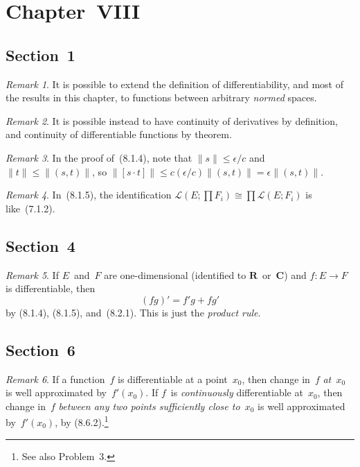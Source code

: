 \documentclass[letterpaper,12pt]{article}
\newcommand{\R}{\mathbf{R}}
\newcommand{\C}{\mathbf{C}}
\renewcommand{\L}{\mathcal{L}}
\newcommand{\iso}{\cong}
\newcommand{\norm}[1]{\lVert{#1}\rVert}
\newcommand{\cbprod}[2]{[{#1}\cdot{#2}]}
\theoremstyle{plain}
\theoremstyle{definition}
\theoremstyle{remark}
\newtheorem*{rmk}{Remark}
\begin{document}
\section*{Chapter~VIII}
\subsection*{Section~1}
\begin{rmk}
It is possible to extend the definition of differentiability, and most of the results in this chapter, to functions between arbitrary \emph{normed} spaces.
\end{rmk}

\begin{rmk}
It is possible instead to have continuity of derivatives by definition, and continuity of differentiable functions by theorem.
\end{rmk}

\begin{rmk}
In the proof of~(8.1.4), note that \(\norm{s}\le\epsilon/c\) and \(\norm{t}\le\norm{(s,t)}\), so \(\norm{\cbprod{s}{t}}\le c(\epsilon/c)\norm{(s,t)}=\epsilon\norm{(s,t)}\).
\end{rmk}

\begin{rmk}
In~(8.1.5), the identification \(\L(E;\prod F_i)\iso\prod\L(E;F_i)\) is like~(7.1.2).
\end{rmk}

\subsection*{Section~4}
\begin{rmk}
If \(E\)~and~\(F\) are one-dimensional (identified to \(\R\)~or~\(\C\)) and \(f:E\to F\) is differentiable, then
\[(fg)'=f'g+fg'\]
by (8.1.4), (8.1.5), and~(8.2.1). This is just the \emph{product rule}.
\end{rmk}

\subsection*{Section~6}
\begin{rmk}
If a function~\(f\) is differentiable at a point~\(x_0\), then change in~\(f\) \emph{at~\(x_0\)} is well approximated by~\(f'(x_0)\). If \(f\)~is \emph{continuously} differentiable at~\(x_0\), then change in~\(f\) \emph{between any two points sufficiently close to~\(x_0\)} is well approximated by~\(f'(x_0)\), by (8.6.2).\footnote{See also Problem~3.}
\end{rmk}
\end{document}
